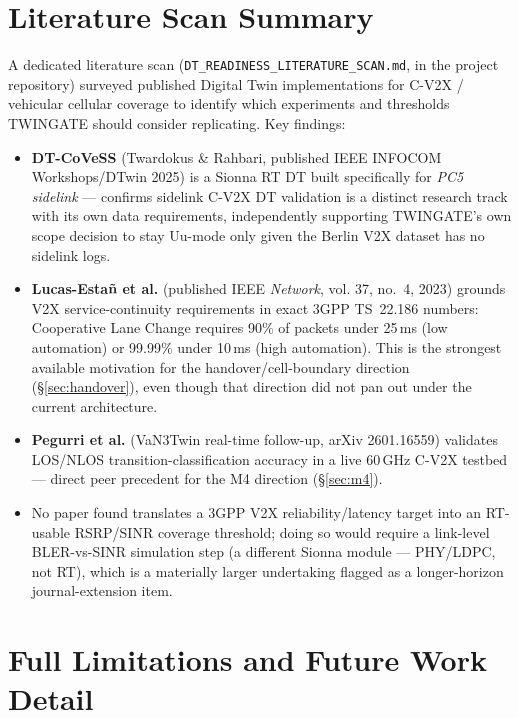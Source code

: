 \documentclass[11pt]{article}
\begin{document}
\section{Literature Scan Summary}
\label{sec:litscan}

A dedicated literature scan (\texttt{DT\_READINESS\_LITERATURE\_SCAN.md},
in the project repository) surveyed published Digital Twin
implementations for C-V2X / vehicular cellular coverage to identify
which experiments and thresholds TWINGATE should consider replicating.
Key findings:

\begin{itemize}
  \item \textbf{DT-CoVeSS} (Twardokus \& Rahbari, published IEEE INFOCOM
        Workshops/DTwin 2025) is a Sionna RT DT built specifically for
        \emph{PC5 sidelink} — confirms sidelink C-V2X DT validation is a
        distinct research track with its own data requirements,
        independently supporting TWINGATE's own scope decision to stay
        Uu-mode only given the Berlin V2X dataset has no sidelink logs.
  \item \textbf{Lucas-Estañ et al.} (published IEEE \emph{Network}, vol.
        37, no.\ 4, 2023) grounds V2X service-continuity requirements in
        exact 3GPP TS~22.186 numbers: Cooperative Lane Change requires
        90\% of packets under 25\,ms (low automation) or 99.99\% under
        10\,ms (high automation). This is the strongest available
        motivation for the handover/cell-boundary direction
        (\S\ref{sec:handover}), even though that direction did not pan
        out under the current architecture.
  \item \textbf{Pegurri et al.} (VaN3Twin real-time follow-up, arXiv
        2601.16559) validates LOS/NLOS transition-classification
        accuracy in a live 60\,GHz C-V2X testbed — direct peer precedent
        for the M4 direction (\S\ref{sec:m4}).
  \item No paper found translates a 3GPP V2X reliability/latency target
        into an RT-usable RSRP/SINR coverage threshold; doing so would
        require a link-level BLER-vs-SINR simulation step (a different
        Sionna module — PHY/LDPC, not RT), which is a materially larger
        undertaking flagged as a longer-horizon journal-extension item.
\end{itemize}

\section{Full Limitations and Future Work Detail}
\label{sec:limitations_full}
\end{document}

